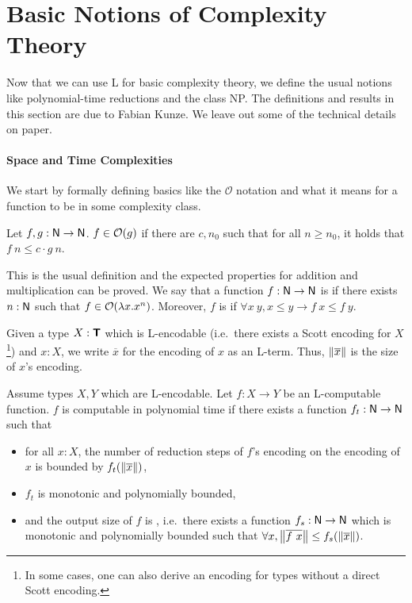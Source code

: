 \section{Basic Notions of Complexity Theory}\label{sec:np_basics}
Now that we can use L for basic complexity theory, we define the usual notions like polynomial-time reductions and the class \textsf{NP}. The definitions and results in this section are due to Fabian Kunze. We leave out some of the technical details on paper.

\paragraph{Space and Time Complexities}
We start by formally defining basics like the $\mathcal{O}$ notation and what it means for a function to be in some complexity class.
\begin{definition}[$\mathcal{O}$][inO]
  Let $f, g : \mathsf{N} \rightarrow \mathsf{N}$. $f \in \mathcal{O}{(g)}$ if there are $c, n_0$ such that for all $n \ge n_0$, it holds that $f~n \le c \cdot g~n$.
\end{definition}
This is the usual definition and the expected properties for addition and multiplication can be proved. 
We say that a function $f : \mathsf{N} \rightarrow \mathsf{N}$ is  if there exists $n : \mathsf{N}$ such that $f \in \mathcal{O}{(\lambda x. x^n)}$. Moreover, $f$ is  if $\forall x~y, x \le y \rightarrow f~x \le f~y$.

Given a type $X : \textsf{\bfseries T}$ which is L-encodable (i.e.\ there exists a Scott encoding for $X$\footnote{In some cases, one can also derive an encoding for types without a direct Scott encoding.}) and $x : X$, we write $\overline{x}$ for the encoding of $x$ as an L-term. Thus, $\left\lVert\overline{x}\right\rVert$ is the size of $x$'s encoding. 
\begin{definition}
  Assume types $X, Y$ which are L-encodable.
  Let $f : X \rightarrow Y$ be an L-computable function.  
  $f$ is computable in polynomial time if there exists a function $f_t : \mathsf{N} \rightarrow \mathsf{N}$ such that
  \begin{itemize}
    \item for all $x : X$, the number of reduction steps of $f$'s encoding on the encoding of $x$ is bounded by $f_t(\left\lVert\overline{x}\right\rVert)$, 
    \item $f_t$ is monotonic and polynomially bounded, 
    \item and the output size of $f$ is , i.e.\ there exists a function $f_s : \mathsf{N} \rightarrow \mathsf{N}$ which is monotonic and polynomially bounded such that $\forall x, \left\lVert\overline{f~x}\right\rVert \le f_s (\left\lVert\overline{x}\right\rVert)$. 
  \end{itemize}
\end{definition}


